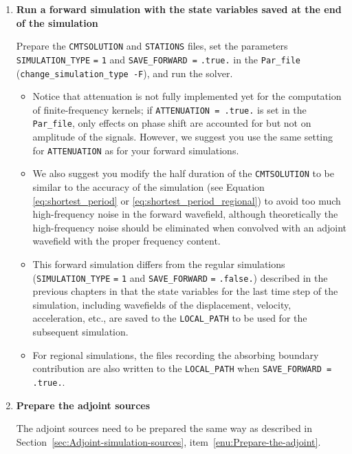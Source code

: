 \documentclass[oneside,english]{book}
\begin{document}
\begin{enumerate}
\item \textbf{Run a forward simulation with the state variables saved at
the end of the simulation}


Prepare the \texttt{\small CMTSOLUTION} and \texttt{\small STATIONS}
files, set the parameters \texttt{\small SIMULATION\_TYPE}{\small{}
}\texttt{\small =}{\small{} }\texttt{\small 1} and \texttt{\small SAVE\_FORWARD
=}{\small{} }\texttt{\small .true.} in the \texttt{Par\_file} (\texttt{change\_simulation\_type
-F}), and run the solver.

\begin{itemize}
\item Notice that attenuation is not fully implemented yet for the computation
of finite-frequency kernels; if \texttt{ATTENUATION = .true.} is set
in the \texttt{Par\_file}, only effects on phase shift are accounted for
but not on amplitude of the signals. However, we suggest you use the same
setting for \texttt{ATTENUATION} as for your forward simulations.
\item We also suggest you modify the half duration of the \texttt{CMTSOLUTION}
to be similar to the accuracy of the simulation (see Equation \ref{eq:shortest_period}
or \ref{eq:shortest_period_regional}) to avoid too much high-frequency
noise in the forward wavefield, although theoretically the high-frequency
noise should be eliminated when convolved with an adjoint wavefield
with the proper frequency content.
\item This forward simulation differs from the regular simulations (\texttt{\small SIMULATION\_TYPE}{\small{}
}\texttt{\small =}{\small{} }\texttt{\small 1} and \texttt{\small SAVE\_FORWARD}{\small{}
}\texttt{\small =}{\small{} }\texttt{\small .false.}) described in
the previous chapters in that the state variables for the last time
step of the simulation, including wavefields of the displacement,
velocity, acceleration, etc., are saved to the \texttt{LOCAL\_PATH}
to be used for the subsequent simulation.
\item For regional simulations, the files recording the absorbing boundary
contribution are also written to the \texttt{LOCAL\_PATH} when \texttt{SAVE\_FORWARD
= .true.}.
\end{itemize}
\item \textbf{Prepare the adjoint sources}


The adjoint sources need to be prepared the same way as described
in Section~\ref{sec:Adjoint-simulation-sources}, item~\ref{enu:Prepare-the-adjoint}.


\end{enumerate}
\end{document}
